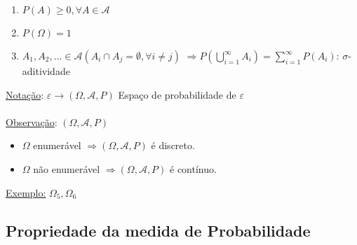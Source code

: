 \documentclass[a4paper,12pt]{article}
\begin{document}
\begin{enumerate}[label=\roman*)]
	\item $P(A)\ge 0, \forall A\in \mathscr{A} $
	\item $P(\Omega)=1$
	\item $A_1,A_2,\ldots \in \mathscr{A}(A_i\cap A_j=\emptyset, \forall i\ne j )$
	$\Rightarrow P(\bigcup\limits_{i=1}^{\infty}A_i) = \sum\limits_{i=1}^\infty  P(A_i)$: $\sigma$-aditividade
\end{enumerate}

\underline{Notação}:
$\varepsilon\longrightarrow (\Omega,\mathscr{A},P) $ Espaço de probabilidade de $\varepsilon$\\
\\
\underline{Observação}: $(\Omega,\mathscr{A},P)$
\begin{itemize}
	\item $\Omega$ enumerável $\Rightarrow (\Omega,\mathscr{A},P)$ é discreto.
	\item $\Omega$ não enumerável $\Rightarrow (\Omega,\mathscr{A},P)$ é contínuo.
	
\end{itemize}

\underline{Exemplo:} $\Omega_5,\Omega_6$
\newpage
\subsection{Propriedade da medida de Probabilidade}
\end{document}
